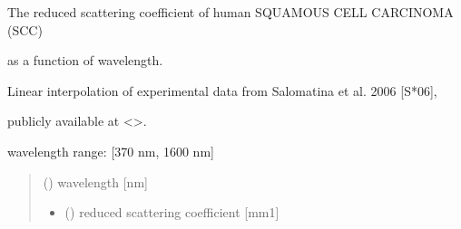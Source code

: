 \documentclass[letterpaper,10pt,english]{sphinxmanual}
\begin{document}

\begin{fulllineitems}
\label{\detokenize{04_scattering_coefficient:skinoptics.scattering_coefficient.rmus_SCC_Salomatina}}
\pysigstartsignatures
{}
\pysigstopsignatures
\begin{DUlineblock}{0em}
\item[] The reduced scattering coefficient of human SQUAMOUS CELL CARCINOMA (SCC)
\item[] as a function of wavelength.
\item[] Linear interpolation of experimental data from Salomatina et al. 2006 {[}S*06{]},
\item[] publicly available at \textless{}\textgreater{}.
\end{DUlineblock}

\begin{DUlineblock}{0em}
\item[] wavelength range: {[}370 nm, 1600 nm{]}
\end{DUlineblock}
\begin{quote}\begin{description}
\sphinxAtStartPar
{} () \textendash{} wavelength {[}nm{]}

\sphinxAtStartPar
\begin{itemize}
\item {} 
\sphinxAtStartPar
{} () \textendash{} reduced scattering coefficient {[}mm\sphinxhyphen{}1{]}

\end{itemize}


\end{description}\end{quote}

\end{fulllineitems}
\end{document}
